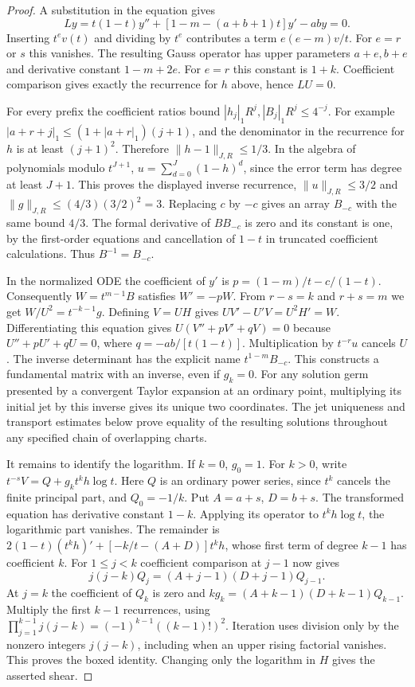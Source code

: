 \begin{proof}
A substitution in the equation gives
\[
 L y=t(1-t)y''+[1-m-(a+b+1)t]y'-aby=0 .
\]
Inserting $t^e v(t)$ and dividing by $t^e$ contributes a term
$e(e-m)v/t$. For $e=r$ or $s$ this vanishes. The resulting Gauss operator
has upper parameters $a+e,b+e$ and derivative constant $1-m+2e$.
For $e=r$ this constant is $1+k$. Coefficient comparison gives exactly
the recurrence for $h$ above, hence $LU=0$.

For every prefix the coefficient ratios bound
$|h_j|_1 R^j, |B_j|_1 R^j\le 4^{-j}$. For example
$|a+r+j|_1\le(1+|a+r|_1)(j+1)$, and the denominator in the recurrence
for $h$ is at least $(j+1)^2$. Therefore $\|h-1\|_{J,R}\le1/3$.
In the algebra of polynomials modulo $t^{J+1}$,
$u=\sum_{d=0}^{J}(1-h)^d$, since the error term has degree at least
$J+1$. This proves the displayed inverse recurrence,
$\|u\|_{J,R}\le3/2$ and $\|g\|_{J,R}\le(4/3)(3/2)^2=3$.
Replacing $c$ by $-c$ gives an array $B_{-c}$ with the same bound
$4/3$. The formal derivative of $B B_{-c}$ is zero and its constant is
one, by the first-order equations and cancellation of $1-t$ in truncated
coefficient calculations. Thus $B^{-1}=B_{-c}$.

In the normalized ODE the coefficient of $y'$ is
$p=(1-m)/t-c/(1-t)$. Consequently $W=t^{m-1}B$ satisfies $W'=-pW$.
From $r-s=k$ and $r+s=m$ we get $W/U^2=t^{-k-1}g$. Defining
$V=UH$ gives $UV'-U'V=U^2 H'=W$. Differentiating this equation gives
$U(V''+pV'+qV)=0$ because $U''+pU'+qU=0$, where
$q=-ab/[t(1-t)]$. Multiplication by $t^{-r}u$ cancels $U$.
The inverse determinant has the explicit name $t^{1-m}B_{-c}$. This
constructs a fundamental matrix with an inverse, even if $g_k=0$.
For any solution germ presented by a convergent Taylor expansion at an
ordinary point, multiplying its initial jet by this inverse gives its
unique two coordinates. The jet uniqueness and transport estimates below
prove equality of the resulting solutions throughout any specified chain
of overlapping charts.

It remains to identify the logarithm. If $k=0$, $g_0=1$. For $k>0$, write
$t^{-s}V=Q+g_k t^k h\log t$. Here $Q$ is an ordinary power series, since
$t^k$ cancels the finite principal part, and $Q_0=-1/k$.
Put $A=a+s$, $D=b+s$. The transformed equation has derivative constant
$1-k$. Applying its operator to $t^k h\log t$, the logarithmic part
vanishes. The remainder is
$2(1-t)(t^k h)' +[-k/t-(A+D)]t^k h$, whose first term of degree $k-1$
has coefficient $k$. For $1\le j<k$ coefficient comparison at $j-1$ now
gives
\[
 j(j-k)Q_j=(A+j-1)(D+j-1)Q_{j-1}.
\]
At $j=k$ the coefficient of $Q_k$ is zero and
$kg_k=(A+k-1)(D+k-1)Q_{k-1}$. Multiply the first $k-1$ recurrences,
using $\prod_{j=1}^{k-1}j(j-k)=(-1)^{k-1}((k-1)!)^2$.
Iteration uses division only by the nonzero integers $j(j-k)$, including
when an upper rising factorial vanishes. This proves the boxed identity.
Changing only the logarithm in $H$ gives the asserted shear.
\end{proof}

